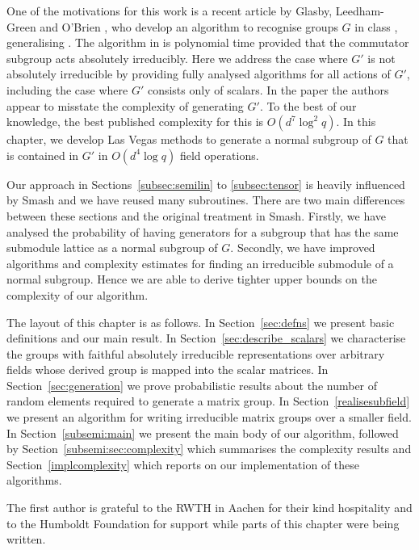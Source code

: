 One of the motivations for this work is a 
recent article by Glasby, Leedham-Green and 
O'Brien \cite{GLGOB}, who develop an algorithm 
to recognise  groups $G$ in class ,  
generalising   
\cite{GlasbyHowlett}. The algorithm in \cite{GLGOB} 
is polynomial time provided that the commutator 
subgroup acts absolutely 
irreducibly. Here we address the case where $G'$ 
is not absolutely irreducible by providing fully 
analysed algorithms for all 
actions of $G'$, including the case where $G'$ 
consists only of scalars.  In the paper \cite{GLGOB} 
the authors appear to misstate the complexity of 
generating $G'$. To the best of our knowledge,
the best published complexity for this is 
$O(d^7 \log^2 q)$. In this chapter, we develop Las Vegas methods to generate 
a normal subgroup of $G$ that is contained in $G'$ in $O(d^4 \log q)$ field 
operations. 

Our approach in Sections~\ref{subsec:semilin} 
to \ref{subsec:tensor} is heavily influenced 
by {\sc Smash} \cite{smashnormal} and we have reused 
many subroutines. There are two main differences between 
these sections and the original treatment in 
{\sc Smash}. Firstly, we have analysed the probability of having
generators for a subgroup 
that has the same submodule lattice as a normal 
subgroup of $G$. Secondly, we have improved algorithms and 
complexity estimates for finding an irreducible 
submodule of a normal subgroup. Hence we are able to derive 
tighter upper bounds on the complexity
of our algorithm.

The layout of this chapter is as follows. In Section~\ref{sec:defns}
 we present basic definitions and our main result. In 
Section~\ref{sec:describe_scalars} we characterise the groups with 
faithful absolutely irreducible representations over arbitrary fields
 whose derived group 
is mapped into the scalar matrices. In 
Section~\ref{sec:generation} we prove probabilistic results 
about the number of random elements required to generate  a matrix group. 
In Section~\ref{realisesubfield} we present an 
algorithm for writing irreducible matrix groups over a smaller field. 
In Section~\ref{subsemi:main} we present the main body of our algorithm,
followed by Section~\ref{subsemi:sec:complexity} which summarises the complexity 
results and Section~\ref{implcomplexity} which reports on our implementation 
of these algorithms. 

The first author is grateful to the RWTH in Aachen for their kind 
hospitality and to the Humboldt Foundation for support while parts of
this chapter were being written. 

